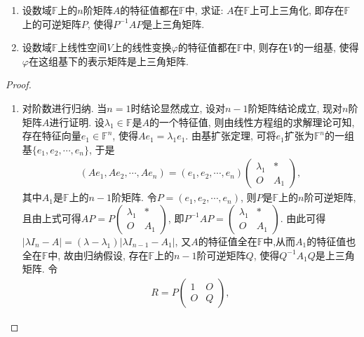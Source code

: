 \documentclass[../../main.tex]{subfiles}
\begin{document}
\begin{proposition}[矩阵的上三角化]\label{proposition:特征值全在同一数域的矩阵可上三角化}
\begin{enumerate}
\item 设数域\(\mathbb{F}\)上的\(n\)阶矩阵\(A\)的特征值都在\(\mathbb{F}\)中, 求证: \(A\)在\(\mathbb{F}\)上可上三角化, 即存在\(\mathbb{F}\)上的可逆矩阵\(P\), 使得\(P^{-1}AP\)是上三角矩阵.
\item 设数域\(\mathbb{F}\)上线性空间\(V\)上的线性变换\(\varphi\)的特征值都在\(\mathbb{F}\)中, 则存在\(V\)的一组基, 使得\(\varphi\)在这组基下的表示矩阵是上三角矩阵. 
\end{enumerate}
\end{proposition}
\begin{proof}
\begin{enumerate}
\item 对阶数进行归纳. 当\(n = 1\)时结论显然成立, 设对\(n - 1\)阶矩阵结论成立, 现对\(n\)阶矩阵\(A\)进行证明. 设\(\lambda_{1} \in \mathbb{F}\)是\(A\)的一个特征值, 则由线性方程组的求解理论可知, 存在特征向量\(e_{1} \in \mathbb{F}^n\), 使得\(Ae_{1}=\lambda_{1}e_{1}\). 由基扩张定理, 可将\(e_{1}\)扩张为\(\mathbb{F}^n\)的一组基\(\{e_{1},e_{2},\cdots ,e_{n}\}\), 于是
\begin{align*}
(Ae_{1},Ae_{2},\cdots ,Ae_{n})=(e_{1},e_{2},\cdots ,e_{n})\begin{pmatrix}
\lambda_{1}& *\\
O&A_{1}
\end{pmatrix},
\end{align*}
其中\(A_{1}\)是\(\mathbb{F}\)上的\(n - 1\)阶矩阵. 令\(P=(e_{1},e_{2},\cdots ,e_{n})\), 则\(P\)是\(\mathbb{F}\)上的\(n\)阶可逆矩阵, 且由上式可得\(AP = P\begin{pmatrix}
\lambda_{1}& *\\
O&A_{1}
\end{pmatrix}\), 即\(P^{-1}AP=\begin{pmatrix}
\lambda_{1}& *\\
O&A_{1}
\end{pmatrix}\). 由此可得\(|\lambda I_{n}-A| = (\lambda - \lambda_{1})|\lambda I_{n - 1}-A_{1}|\), 又$A$的特征值全在$\mathbb{F}$中,从而\(A_{1}\)的特征值也全在\(\mathbb{F}\)中, 故由归纳假设, 存在\(\mathbb{F}\)上的\(n - 1\)阶可逆矩阵\(Q\), 使得\(Q^{-1}A_{1}Q\)是上三角矩阵. 令
\begin{align*}
R = P\begin{pmatrix}
1& O\\
O& Q
\end{pmatrix},
\end{align*}

\end{enumerate}
\end{proof}
\end{document}

